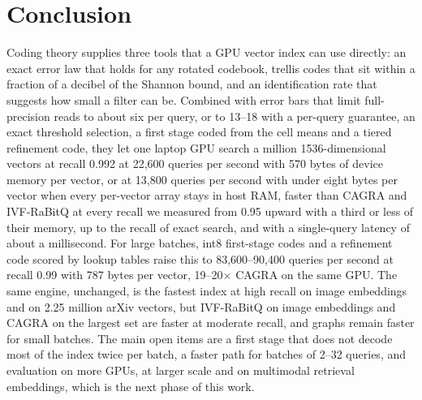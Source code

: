 \documentclass[fleqn,10pt]{wlscirep}
\begin{document}
\section{Conclusion}
Coding theory supplies three tools that a GPU vector index can use directly: an exact error law that holds for any rotated codebook, trellis codes that sit within a fraction of a decibel of the Shannon bound, and an identification rate that suggests how small a filter can be. Combined with error bars that limit full-precision reads to about six per query, or to 13--18 with a per-query guarantee, an exact threshold selection, a first stage coded from the cell means and a tiered refinement code, they let one laptop GPU search a million 1536-dimensional vectors at recall 0.992 at 22{,}600 queries per second with 570 bytes of device memory per vector, or at 13{,}800 queries per second with under eight bytes per vector when every per-vector array stays in host RAM, faster than CAGRA and IVF-RaBitQ at every recall we measured from 0.95 upward with a third or less of their memory, up to the recall of exact search, and with a single-query latency of about a millisecond. For large batches, int8 first-stage codes and a refinement code scored by lookup tables raise this to 83{,}600--90{,}400 queries per second at recall 0.99 with 787 bytes per vector, 19--20$\times$ CAGRA on the same GPU. The same engine, unchanged, is the fastest index at high recall on image embeddings and on 2.25 million arXiv vectors, but IVF-RaBitQ on image embeddings and CAGRA on the largest set are faster at moderate recall, and graphs remain faster for small batches. The main open items are a first stage that does not decode most of the index twice per batch, a faster path for batches of 2--32 queries, and evaluation on more GPUs, at larger scale and on multimodal retrieval embeddings, which is the next phase of this work.


\end{document}
